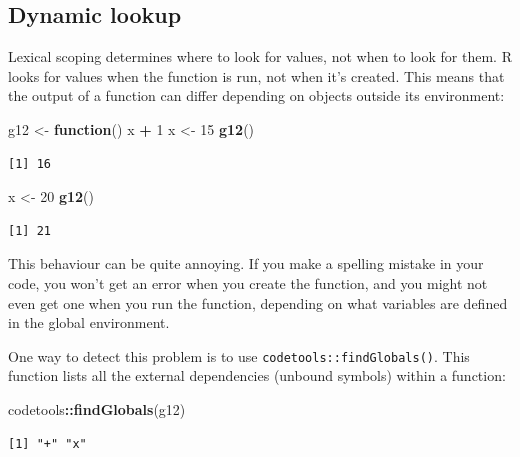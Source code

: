 \documentclass[]{book}
\newenvironment{Shaded}{\begin{snugshade}}{\end{snugshade}}
\newcommand{\ControlFlowTok}[1]{\textcolor[rgb]{0.13,0.29,0.53}{\textbf{#1}}}
\newcommand{\DecValTok}[1]{\textcolor[rgb]{0.00,0.00,0.81}{#1}}
\newcommand{\KeywordTok}[1]{\textcolor[rgb]{0.13,0.29,0.53}{\textbf{#1}}}
\newcommand{\NormalTok}[1]{#1}
\newcommand{\OperatorTok}[1]{\textcolor[rgb]{0.81,0.36,0.00}{\textbf{#1}}}
\newcommand{\StringTok}[1]{\textcolor[rgb]{0.31,0.60,0.02}{#1}}
\theoremstyle{definition}
\theoremstyle{definition}
\theoremstyle{definition}
\theoremstyle{remark}
\begin{document}
\hypertarget{dynamic-lookup}{%
\subsection{Dynamic lookup}\label{dynamic-lookup}}

Lexical scoping determines where to look for values, not when to look
for them. R looks for values when the function is run, not when it's
created. This means that the output of a function can differ depending
on objects outside its environment:

\begin{Shaded}
\begin{Highlighting}[]
\NormalTok{g12 <-}\StringTok{ }\ControlFlowTok{function}\NormalTok{() x }\OperatorTok{+}\StringTok{ }\DecValTok{1}
\NormalTok{x <-}\StringTok{ }\DecValTok{15}
\KeywordTok{g12}\NormalTok{()}
\end{Highlighting}
\end{Shaded}

\begin{verbatim}
[1] 16
\end{verbatim}

\begin{Shaded}
\begin{Highlighting}[]
\NormalTok{x <-}\StringTok{ }\DecValTok{20}
\KeywordTok{g12}\NormalTok{()}
\end{Highlighting}
\end{Shaded}

\begin{verbatim}
[1] 21
\end{verbatim}

This behaviour can be quite annoying. If you make a spelling mistake in
your code, you won't get an error when you create the function, and you
might not even get one when you run the function, depending on what
variables are defined in the global environment.

One way to detect this problem is to use
\texttt{codetools::findGlobals()}. This function lists all the external
dependencies (unbound symbols) within a function:

\begin{Shaded}
\begin{Highlighting}[]
\NormalTok{codetools}\OperatorTok{::}\KeywordTok{findGlobals}\NormalTok{(g12)}
\end{Highlighting}
\end{Shaded}

\begin{verbatim}
[1] "+" "x"
\end{verbatim}
\end{document}
